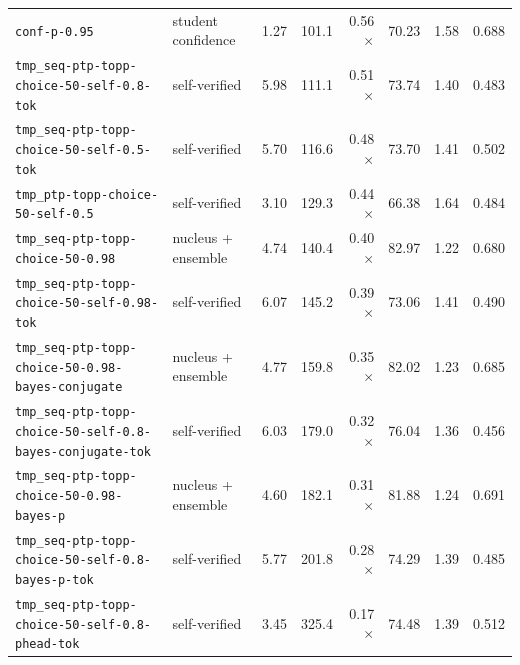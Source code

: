 {\begin{tabular}{llrrrrrr}
\texttt{conf-p-0.95} & student confidence & 1.27 & 101.1 & 0.56$\times$ & 70.23 & 1.58 & 0.688 \\
\texttt{tmp\_seq-ptp-topp-choice-50-self-0.8-tok} & self-verified & 5.98 & 111.1 & 0.51$\times$ & 73.74 & 1.40 & 0.483 \\
\texttt{tmp\_seq-ptp-topp-choice-50-self-0.5-tok} & self-verified & 5.70 & 116.6 & 0.48$\times$ & 73.70 & 1.41 & 0.502 \\
\texttt{tmp\_ptp-topp-choice-50-self-0.5} & self-verified & 3.10 & 129.3 & 0.44$\times$ & 66.38 & 1.64 & 0.484 \\
\texttt{tmp\_seq-ptp-topp-choice-50-0.98} & nucleus + ensemble & 4.74 & 140.4 & 0.40$\times$ & 82.97 & 1.22 & 0.680 \\
\texttt{tmp\_seq-ptp-topp-choice-50-self-0.98-tok} & self-verified & 6.07 & 145.2 & 0.39$\times$ & 73.06 & 1.41 & 0.490 \\
\texttt{tmp\_seq-ptp-topp-choice-50-0.98-bayes-conjugate} & nucleus + ensemble & 4.77 & 159.8 & 0.35$\times$ & 82.02 & 1.23 & 0.685 \\
\texttt{tmp\_seq-ptp-topp-choice-50-self-0.8-bayes-conjugate-tok} & self-verified & 6.03 & 179.0 & 0.32$\times$ & 76.04 & 1.36 & 0.456 \\
\texttt{tmp\_seq-ptp-topp-choice-50-0.98-bayes-p} & nucleus + ensemble & 4.60 & 182.1 & 0.31$\times$ & 81.88 & 1.24 & 0.691 \\
\texttt{tmp\_seq-ptp-topp-choice-50-self-0.8-bayes-p-tok} & self-verified & 5.77 & 201.8 & 0.28$\times$ & 74.29 & 1.39 & 0.485 \\
\texttt{tmp\_seq-ptp-topp-choice-50-self-0.8-phead-tok} & self-verified & 3.45 & 325.4 & 0.17$\times$ & 74.48 & 1.39 & 0.512 \\
\bottomrule
\end{tabular}
}